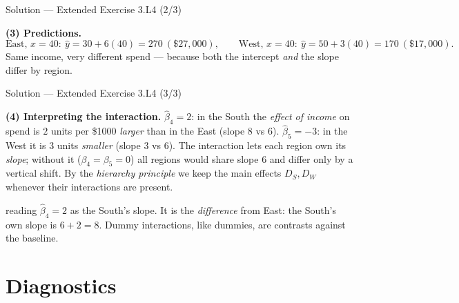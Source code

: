\documentclass[aspectratio=169,11pt]{beamer}
\begin{document}
\begin{frame}{Solution --- Extended Exercise 3.L4 (2/3)}
  \begin{solutionbox}
    \textbf{(3) Predictions.}
    \[
      \text{East, } x{=}40:\ \hat y = 30+6(40)=270\ (\$27{,}000),\qquad
      \text{West, } x{=}40:\ \hat y = 50+3(40)=170\ (\$17{,}000).
    \]
    Same income, very different spend --- because both the intercept
    \emph{and} the slope differ by region.
  \end{solutionbox}
\end{frame}

\begin{frame}{Solution --- Extended Exercise 3.L4 (3/3)}
  \begin{solutionbox}
    \textbf{(4) Interpreting the interaction.} $\hat\beta_4=2$: in the
    South the \emph{effect of income} on spend is $2$ units per \$1000
    \emph{larger} than in the East (slope $8$ vs $6$). $\hat\beta_5=-3$:
    in the West it is $3$ units \emph{smaller} (slope $3$ vs $6$). The
    interaction lets each region own its \emph{slope}; without it
    ($\beta_4=\beta_5=0$) all regions would share slope $6$ and differ
    only by a vertical shift. By the \emph{hierarchy principle} we keep
    the main effects $D_S,D_W$ whenever their interactions are present.
  \end{solutionbox}
  \begin{mistake}
    reading $\hat\beta_4=2$ as the South's
    slope. It is the \emph{difference} from East: the South's own slope
    is $6+2=8$. Dummy interactions, like dummies, are contrasts against
    the baseline.
  \end{mistake}
\end{frame}

\section{Diagnostics}
\end{document}
